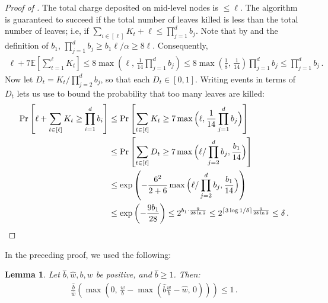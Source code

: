\documentclass[10pt,a4paper]{article}
\newtheorem{lemma}[theorem]{Lemma}
\theoremstyle{definition}
\theoremstyle{remark}
\newcommand{\EE}{\mathbb{E}}
\newcommand{\hw}{\hat{w}}
\newcommand{\hb}{\hat{b}}
\newcommand{\ceil}[1]{{\left\lceil{#1}\right\rceil}}
\newcommand{\rl}{\mathbf{\ell}}             %
\begin{document}
\begin{itemize}
\begin{itemize}
\begin{proof}[Proof of ]
  The total charge deposited on mid-level nodes is $\le \rl$. The algorithm is guaranteed to succeed if the total number of leaves killed is less than the total number of leaves; i.e, if $\sum_{i \in [\rl]} K_t + \rl \le \prod_{j=1}^{d} b_j$. Note that by  and the definition of $b_1$, $\prod_{j=1}^{d} b_j \ge b_1 \rl / \alpha \ge 8 \rl$. Consequently,
  \begin{align*}
    \rl + 7 \EE\left[\sum_{t = 1}^{\rl} K_t\right] 
    \le 8 \max\left(\rl,\, \frac{1}{14} \prod_{j=1}^{d} b_j\right)
    \le 8 \max\left(\frac{1}{8},\, \frac{1}{14}\right) \prod_{j=1}^{d} b_j \le  \prod_{j=1}^{d} b_j \,.
  \end{align*}
  Now let $D_t = K_t / \prod_{j=2}^{d} b_j$, so that each $D_t \in [0,1]$. Writing events in terms of $D_t$ lets us use  to bound the probability that too many leaves are killed:
  \begin{align*}
  \Pr\left[\rl + \sum_{t \in [\rl]} K_t \ge \prod_{i=1}^{d} b_i\right] &\le 
      \Pr\left[\sum_{t \in [\rl]} K_t \ge 7 \max\Big(\rl, \frac{1}{14} \prod_{j=1}^{d} b_j\Big) \right] \\
      &\le \Pr\left[\sum_{t \in [\rl]} D_t \ge 7 \max\Big(\rl / \prod_{j=2}^{d} b_j, \frac{b_1}{14} \Big) \right] \\
      &\le \exp\left( - \frac{6^2}{2+6} \max\Big(\rl / \prod_{j=2}^{d} b_j, \frac{b_1}{14} \Big) \right) \\
      &\le \exp\left( - \frac{9 b_1}{28} \right) \le 2^{b_1 \cdot \frac{9}{28 \ln 2}} \le 2^{\ceil{3 \log 1/\delta} \frac{9}{28 \ln 2}} \le \delta \,. \qedhere
  \end{align*}  
\end{proof}

In the preceding proof, we used the following:

\begin{lemma}\label{lem:charge-adjusted-gain}
  Let $\hb,\hw,b,w$ be positive, and $\hb \ge 1$. Then:
  \begin{align*}
    \frac{\hb}{\hw} \left( \max\left(0,\, \frac{w}{b} - \max\left(\hb \frac{w}{b} - \hw,\, 0\right) \right)\right) \le 1 \,.
  \end{align*}
\end{lemma}


\end{itemize}
\end{itemize}
\end{document}
